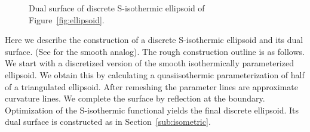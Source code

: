 \documentclass[Thesis.tex]{subfiles}
\begin{document}
\begin{figure}
\centering
{}
\caption{Dual surface of discrete S-isothermic ellipsoid of Figure~\ref{fig:ellipsoid}. }
\label{fig:ellipsoid_dual} 
\end{figure}

Here we describe the construction of a discrete S-isothermic ellipsoid and 
its dual surface. (See \cite[p.~202]{Hertrich2003} for the smooth analog).
The rough construction outline is as follows. We start with a discretized version
of the smooth isothermically parameterized ellipsoid. We obtain this by calculating a 
quasiisothermic parameterization of half of a triangulated ellipsoid. After remeshing 
the parameter lines are approximate curvature lines. We complete the surface by reflection
at the boundary. 
Optimization of the S-isothermic functional yields the final discrete ellipsoid. Its 
dual surface is constructed as in Section~\ref{sub:isometric}.
\end{document}
